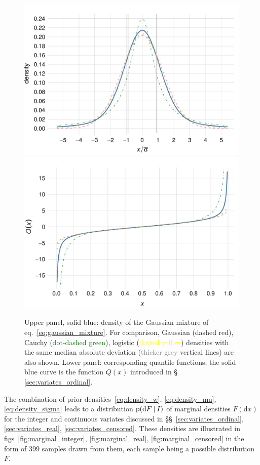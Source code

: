 \documentclass[\ifafour a4paper,12pt,\else a5paper,10pt,\fi%
onecolumn,oneside,article,%
british%
]{memoir}
\theoremstyle{remark}
\theoremstyle{innote}
\newcommand*{\di}{\mathrm{d}}%
\newcommand*{\p}{\mathrm{p}}%
\renewcommand*{\|}[1][]{\nonscript\:#1\vert\nonscript\:\mathopen{}}
\newcommand*{\sect}{\S}%
\newcommand*{\sects}{\S\S}%
\newcommand*{\eqn}{eq.}%
\newcommand*{\figs}{figs}%
\begin{document}
\begin{figure}
\centering\includegraphics[width=0.75\linewidth]{Gaussmix.pdf}\\%
\includegraphics[width=0.75\linewidth]{Qfunction2.pdf}%
\\
\caption{Upper panel, \textcolor{bluepurple}{solid blue}: density of the Gaussian mixture of \eqn~\eqref{eq:gaussian_mixture}. For comparison, Gaussian (\textcolor{redpurple}{dashed red}), Cauchy (\textcolor{green}{dot-dashed green}), logistic (\textcolor{yellow}{dotted yellow}) densities with the same median absolute deviation (\textcolor{grey}{thicker grey} vertical lines) are also shown. Lower panel: corresponding quantile functions; the \textcolor{bluepurple}{solid blue} curve is the function $Q(x)$ introduced in \sect\,\ref{sec:variates_ordinal}.}\label{fig:gaussmix}
\end{figure}

\medskip

The combination of prior densities~\eqref{eq:density_w}, \eqref{eq:density_mu}, \eqref{eq:density_sigma} leads to a distribution $\p(\di F\|I)$ of marginal densities $F(\di x)$ for the integer and continuous variates discussed in \sects~\ref{sec:variates_ordinal}, \ref{sec:variates_real}, \ref{sec:variates_censored}. These densities are illustrated in \figs~\ref{fig:marginal_integer}, \ref{fig:marginal_real}, \ref{fig:marginal_censored} in the form of 399 samples drawn from them, each sample being a possible distribution $F$.
\end{document}
